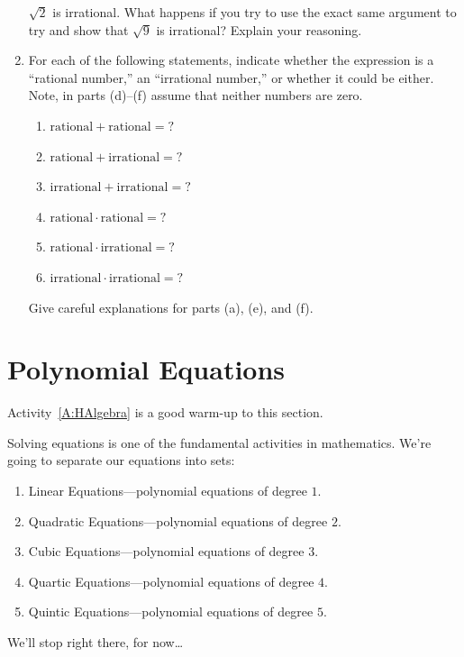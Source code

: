 \begin{problems}
\begin{enumerate}
  $\sqrt{2}$ is irrational. What happens if you try to use the exact
  same argument to try and show that $\sqrt{9}$ is irrational? Explain
  your reasoning.
\item For each of the following statements, indicate whether the expression
is a ``rational number,'' an ``irrational number,'' or whether it could be
either. Note, in parts (d)--(f) assume that neither numbers are zero.
\begin{enumerate}
\item $\text{rational}+ \text{rational} = ?$
\item $\text{rational}+ \text{irrational} = ?$
\item $\text{irrational}+ \text{irrational} = ?$

\item $\text{rational}\cdot \text{rational} = ?$
\item $\text{rational}\cdot \text{irrational} = ?$
\item $\text{irrational}\cdot \text{irrational} = ?$
\end{enumerate}
Give careful explanations for parts (a), (e), and (f).
\end{enumerate}
\end{problems}
\newpage




\section{Polynomial Equations}


\begin{teachingnote}
Activity~\ref{A:HAlgebra} is a good warm-up to this section. 
\end{teachingnote}

Solving equations is one of the fundamental activities in mathematics.
We're going to separate our equations into sets:
\begin{enumerate}
\item Linear Equations---polynomial equations of degree $1$.
\item Quadratic Equations---polynomial equations of degree $2$.
\item Cubic  Equations---polynomial equations of degree $3$.
\item Quartic Equations---polynomial equations of degree $4$.
\item Quintic Equations---polynomial equations of degree $5$.
\end{enumerate}
We'll stop right there, for now\dots


